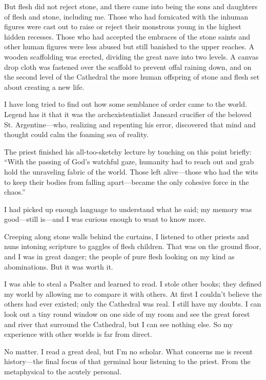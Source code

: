 But flesh did not reject stone, and there came into being the sons and daughters of flesh and stone, including me. Those who had fornicated with the inhuman figures were cast out to raise or reject their monstrous young in the highest hidden recesses. Those who had accepted the embraces of the stone saints and other human figures were less abused but still banished to the upper reaches. A wooden scaffolding was erected, dividing the great nave into two levels. A canvas drop cloth was fastened over the scaffold to prevent offal raining down, and on the second level of the Cathedral the more human offspring of stone and flesh set about creating a new life.

I have long tried to find out how some semblance of order came to the world. Legend has it that it was the archexistentialist Jansard crucifier of the beloved St. Argentine—who, realizing and repenting his error, discovered that mind and thought could calm the foaming sea of reality.

The priest finished his all-too-sketchy lecture by touching on this point briefly: ``With the passing of God's watchful gaze, humanity had to reach out and grab hold the unraveling fabric of the world. Those left alive—those who had the wits to keep their bodies from falling apart—became the only cohesive force in the chaos.''

I had picked up enough language to understand what he said; my memory was good—still is—and I was curious enough to want to know more.

Creeping along stone walls behind the curtains, I listened to other priests and nuns intoning scripture to gaggles of flesh children. That was on the ground floor, and I was in great danger; the people of pure flesh looking on my kind as abominations. But it was worth it.

I was able to steal a Psalter and learned to read. I stole other books; they defined my world by allowing me to compare it with others. At first I couldn't believe the others had ever existed; only the Cathedral was real. I still have my doubts. I can look out a tiny round window on one side of my room and see the great forest and river that surround the Cathedral, but I can see nothing else. So my experience with other worlds is far from direct.

No matter. I read a great deal, but I'm no scholar. What concerns me is recent history—the final focus of that germinal hour listening to the priest. From the metaphysical to the acutely personal.

